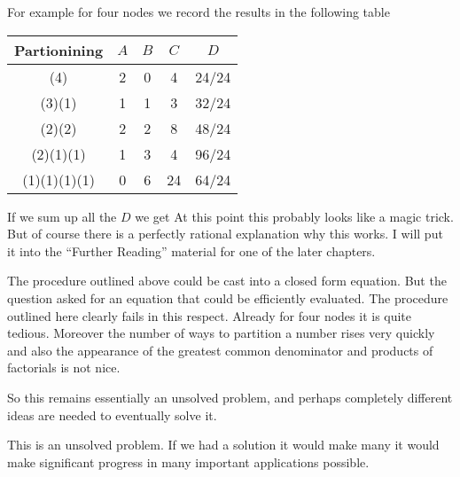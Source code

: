 For example for four nodes we record the results in the following table 
\begin{center}
\begin{tabular}{c | c c c | c}
Partionining & $A$ & $B$ & $C$ & $D$ \\\hline
(4)          & 2   & 0   &  4  & 24/24 \\
(3)(1)       & 1   & 1   &  3  & 32/24 \\
(2)(2)       & 2   & 2   &  8  & 48/24 \\
(2)(1)(1)    & 1   & 3   &  4  & 96/24 \\
(1)(1)(1)(1) & 0   & 6   &  24 & 64/24 \\
\end{tabular}
\end{center}
If we sum up all the $D$ we get
At this point this probably looks like a magic trick. But of course there is a perfectly rational explanation why this works. I will put it into the ``Further Reading'' material for one of the later chapters. 

The procedure outlined above could be cast into a closed form equation. But the question asked for an equation that could be efficiently evaluated. The procedure outlined here clearly fails in this respect. Already for four nodes it is quite tedious. Moreover the number of ways to partition a number rises very quickly and also the appearance of the greatest common denominator and products of factorials is not nice. 

So this remains essentially an unsolved problem, and perhaps completely different ideas are needed to eventually solve it. 





This is an unsolved problem. If we had a solution it would make many it would make significant progress in many important applications possible.

\solutionend